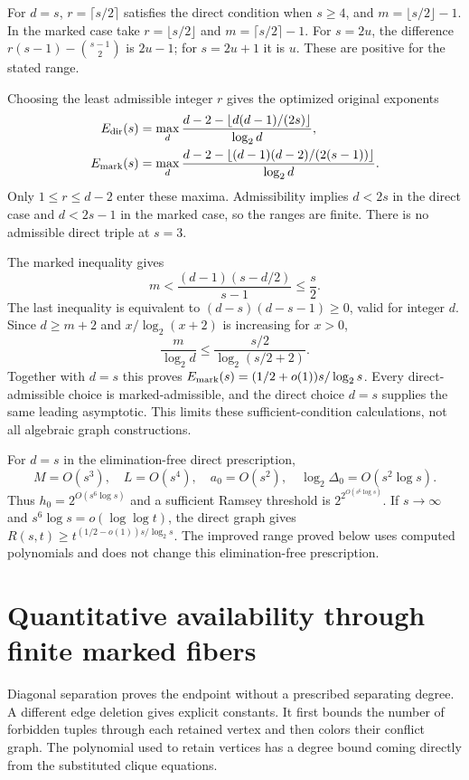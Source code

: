 \documentclass[11pt,a4paper]{article}
\theoremstyle{definition}
\theoremstyle{remark}
\numberwithin{equation}{section}
\begin{document}
For $d=s$, $r=\lceil s/2\rceil$ satisfies the direct condition when $s\ge4$, and $m=\lfloor s/2\rfloor-1$. In the marked case take $r=\lfloor s/2\rfloor$ and $m=\lceil s/2\rceil-1$. For $s=2u$, the difference $r(s-1)-\binom{s-1}2$ is $2u-1$; for $s=2u+1$ it is $u$. These are positive for the stated range.

Choosing the least admissible integer $r$ gives the optimized original exponents
\begin{align}\label{eq:old-optimized}
E_{\rm dir}(s)&=\max_d\frac{d-2-\lfloor d(d-1)/(2s)\rfloor}{\log_2d},\notag\\
E_{\rm mark}(s)&=\max_d\frac{d-2-\lfloor(d-1)(d-2)/(2(s-1))\rfloor}{\log_2d}.
\end{align}
Only $1\le r\le d-2$ enter these maxima. Admissibility implies $d<2s$ in the direct case and $d<2s-1$ in the marked case, so the ranges are finite. There is no admissible direct triple at $s=3$.

The marked inequality gives
\[
m<\frac{(d-1)(s-d/2)}{s-1}\le\frac s2.
\]
The last inequality is equivalent to $(d-s)(d-s-1)\ge0$, valid for integer $d$. Since $d\ge m+2$ and $x/\log_2(x+2)$ is increasing for $x>0$,
\[
\frac m{\log_2d}\le\frac{s/2}{\log_2(s/2+2)}.
\]
Together with $d=s$ this proves $E_{\rm mark}(s)=(1/2+o(1))s/\log_2s$. Every direct-admissible choice is marked-admissible, and the direct choice $d=s$ supplies the same leading asymptotic. This limits these sufficient-condition calculations, not all algebraic graph constructions.

For $d=s$ in the elimination-free direct prescription,
\[
M=O(s^3),\quad L=O(s^4),\quad a_0=O(s^2),\quad\log_2\Delta_0=O(s^2\log s).
\]
Thus $h_0=2^{O(s^6\log s)}$ and a sufficient Ramsey threshold is $2^{2^{O(s^6\log s)}}$. If $s\to\infty$ and $s^6\log s=o(\log\log t)$, the direct graph gives $R(s,t)\ge t^{(1/2-o(1))s/\log_2s}$. The improved range proved below uses computed polynomials and does not change this elimination-free prescription.

\section{Quantitative availability through finite marked fibers}\label{sec:fibers}
Diagonal separation proves the endpoint without a prescribed separating degree. A different edge deletion gives explicit constants. It first bounds the number of forbidden tuples through each retained vertex and then colors their conflict graph. The polynomial used to retain vertices has a degree bound coming directly from the substituted clique equations.
\end{document}
